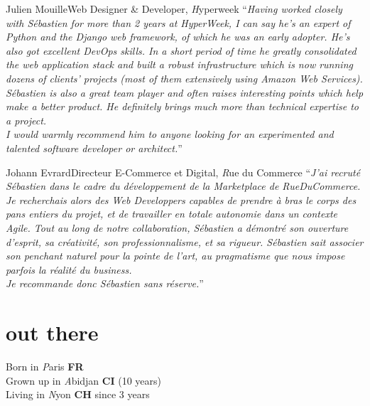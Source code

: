\documentclass[]{friggeri}
\begin{document}
\begin{quoting}{Julien Mouille}{Web Designer \& Developer, {\emph Hyperweek}}
``\textit{Having worked closely with Sébastien for more than 2 years at HyperWeek, I can say he's an expert of Python and the Django web framework, of which he was an early adopter. He's also got excellent DevOps skills. In a short period of time he greatly consolidated the web application stack and built a robust infrastructure which is now running dozens of clients' projects (most of them extensively using Amazon Web Services).\\
Sébastien is also a great team player and often raises interesting points which help make a better product. He definitely brings much more than technical expertise to a project.\\
I would warmly recommend him to anyone looking for an experimented and talented software developer or architect.}''
\end{quoting}

\begin{quoting}{Johann Evrard}{Directeur E-Commerce et Digital, {\emph Rue du Commerce}}
``\textit{J'ai recruté Sébastien dans le cadre du développement de la Marketplace de RueDuCommerce. Je recherchais alors des Web Developpers capables de prendre à bras le corps des pans entiers du projet, et de travailler en totale autonomie dans un contexte Agile.
Tout au long de notre collaboration, Sébastien a démontré son ouverture d'esprit, sa créativité, son professionnalisme, et sa rigueur. Sébastien sait associer son penchant naturel pour la pointe de l'art, au pragmatisme que nous impose parfois la réalité du business.\\
Je recommande donc Sébastien sans réserve.}''
\end{quoting}

\section{out there}

{\FA \faMapMarker} Born in {\emph Paris} {\bf FR}\\
{\FA \faPlane} Grown up in {\emph Abidjan} {\bf CI} (10 years)\\
{\FA \faPlane} Living in {\emph Nyon} {\bf CH} since 3 years
\end{document}
